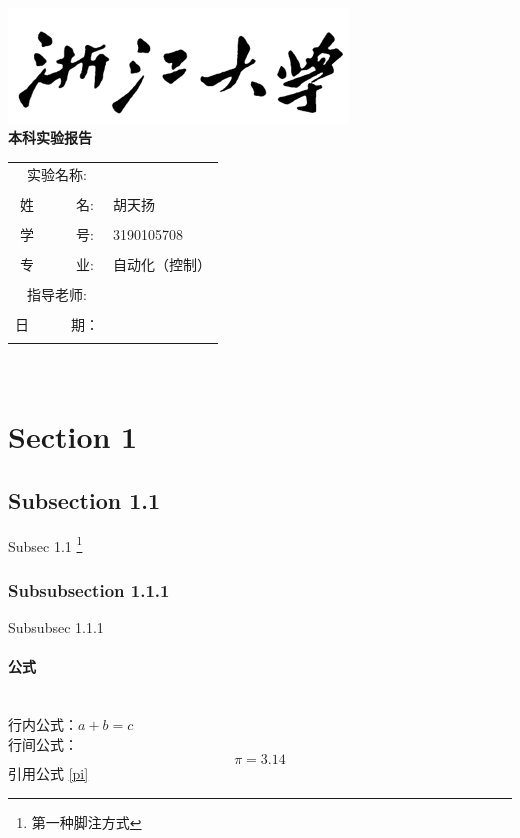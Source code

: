 \documentclass[UTF8, a4paper]{ctexart}
\begin{document}
\begin{center}
    \ \\[80pt]
	\includegraphics[scale=0.8]{logo.png}\\[80pt]
	{\bfseries{\large 本科实验报告}}\\[50pt]
	\begin{tabular}{cl}
		实验名称:& \\
		\cline{2-2}\\
		姓~~~~~~名:& 胡天扬\\
		\cline{2-2}\\
		学~~~~~~号:& 3190105708\\
		\cline{2-2}\\
		专~~~~~~业:& 自动化（控制）\\
		\cline{2-2}\\
		指导老师:& \\
		\cline{2-2}\\
		日~~~~~~期：\\
		\cline{2-2}\\
	\end{tabular}
\end{center}


\newpage
\ \\[50pt]
\tableofcontents    %
\newpage

\section{Section 1} \label{sec1}
\subsection{Subsection 1.1}
Subsec 1.1  \footnote{第一种脚注方式}
\subsubsection{Subsubsection 1.1.1}
Subsubsec 1.1.1 \footnotemark
{}

\paragraph{公式}~{}\\
行内公式：$a+b=c$\\
行间公式：
\begin{equation}
    \label{pi}
    \pi=3.14 \tag{1} 
\end{equation}
引用公式 \eqref{pi}
\end{document}
